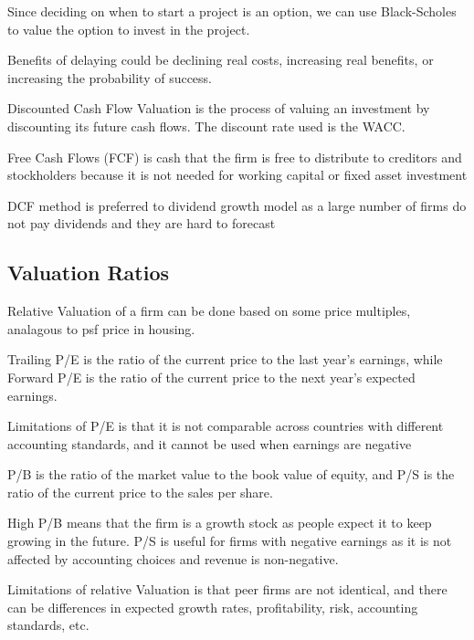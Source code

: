 Since deciding on when to start a project is an option, we can use Black-Scholes to value the option to invest in the project.

Benefits of delaying could be declining real costs, increasing real benefits, or increasing the probability of success.


Discounted Cash Flow Valuation is the process of valuing an investment by discounting its future cash flows. The discount rate used is the WACC.

Free Cash Flows (FCF) is cash that the firm is free to distribute to creditors and stockholders because it is not needed for working capital or fixed asset investment

DCF method is preferred to dividend growth model as a large number of firms do not pay dividends and they are hard to forecast

\subsection{Valuation Ratios}
Relative Valuation of a firm can be done based on some price multiples, analagous to psf price in housing.

Trailing P/E is the ratio of the current price to the last year's earnings, while Forward P/E is the ratio of the current price to the next year's expected earnings.

Limitations of P/E is that it is not comparable across countries with different accounting standards, and it cannot be used when earnings are negative

P/B is the ratio of the market value to the book value of equity, and P/S is the ratio of the current price to the sales per share.

High P/B means that the firm is a growth stock as people expect it to keep growing in the future. P/S is useful 
for firms with negative earnings as it is not affected by accounting choices and revenue is non-negative.

Limitations of relative Valuation is that peer firms are not identical, and there can be differences in expected growth rates,
profitability, risk, accounting standards, etc.

